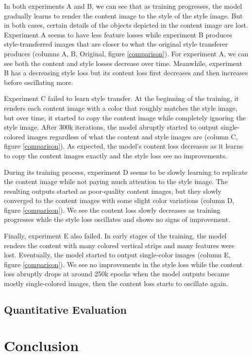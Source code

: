 \documentclass{article}
\begin{document}
In both experiments A and B, we can see that as training progresses, the model gradually learns to render the content image to the style of the style image. But in both cases, certain details of the objects depicted in the content image are lost. Experiment A seems to have less feature losses while experiment B produces style-transferred images that are closer to what the original style transferer produces (columns A, B, Original, figure \ref{comparison}). For experiment A, we can see both the content and style losses decrease over time. Meanwhile, experiment B has a decreasing style loss but its content loss first decreases and then increases before oscillating more.

Experiment C failed to learn style transfer. At the beginning of the training, it renders each content image with a color that roughly matches the style image, but over time, it started to copy the content image while completely ignoring the style image. After 300k iterations, the model abruptly started to output single-colored images regardless of what the content and style images are (column C, figure \ref{comparison}). As expected, the model's content loss decreases as it learns to copy the content images exactly and the style loss see no improvements.

During its training process, experiment D seems to be slowly learning to replicate the content image while not paying much attention to the style image. The resulting outputs started as poor-quality content images, but they slowly converged to the content images with some slight color variations (column D, figure \ref{comparison}). We see the content loss slowly decreases as training progresses while the style loss oscillates and shows no signs of improvement.

Finally, experiment E also failed. In early stages of the training, the model renders the content with many colored vertical strips and many features were lost. Eventually, the model started to output single-color images (column E, figure \ref{comparison}). We see no improvements in the style loss while the content loss abruptly drops at around 250k epochs when the model outputs became mostly single-colored images, then the content loss starts to oscillate again.

\subsection{Quantitative Evaluation}

\section{Conclusion}
\end{document}
